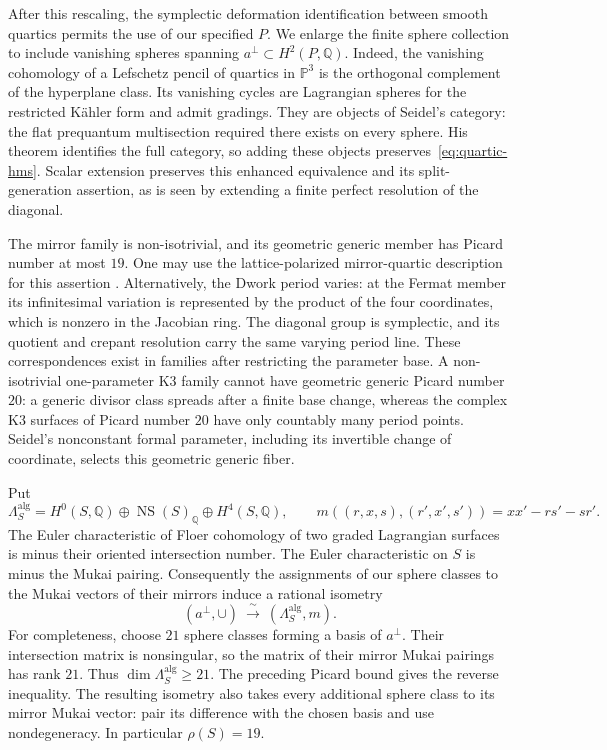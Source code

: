 \documentclass[11pt]{article}
\numberwithin{equation}{section}
\theoremstyle{definition}
\theoremstyle{remark}
\begin{document}
After this rescaling, the symplectic deformation identification between
smooth quartics permits the use of our specified $P$.  We enlarge the finite sphere collection to include
vanishing spheres spanning $a^\perp\subset H^2(P,\mathbb Q)$.  Indeed, the vanishing
cohomology of a Lefschetz pencil of quartics in $\mathbb P^3$ is the orthogonal
complement of the hyperplane class.  Its vanishing cycles are Lagrangian
spheres for the restricted K\"ahler form and admit gradings.  They are objects
of Seidel's category: the flat prequantum multisection required there exists
on every sphere.  His theorem identifies the full category, so adding these
objects preserves~\eqref{eq:quartic-hms}.  Scalar extension preserves this
enhanced equivalence and its split-generation assertion, as is seen by
extending a finite perfect resolution of the diagonal.

The mirror family is non-isotrivial, and its geometric generic member has
Picard number at most $19$.  One may use the lattice-polarized mirror-quartic
description for this assertion \cite{HMS:Dolgachev}.  Alternatively, the Dwork
period varies: at the Fermat member its infinitesimal variation is represented
by the product of the four coordinates, which is nonzero in the Jacobian
ring.  The diagonal group is symplectic, and its quotient and crepant resolution
carry the same varying period line.  These correspondences exist in families
after restricting the parameter base.  A non-isotrivial one-parameter K3
family cannot have geometric generic Picard number $20$: a generic divisor
class spreads after a finite base change, whereas the complex K3 surfaces of
Picard number $20$ have only countably many period points.  Seidel's
nonconstant formal parameter, including its invertible change of coordinate,
selects this geometric generic fiber.

Put
\[
 \Lambda_S^{\mathrm{alg}}=H^0(S,\mathbb Q)\oplus\operatorname{NS}(S)_\mathbb Q\oplus H^4(S,\mathbb Q),
 \qquad
 m((r,x,s),(r',x',s'))=xx'-rs'-sr'.
\]
The Euler characteristic of Floer cohomology of two graded Lagrangian
surfaces is minus their oriented intersection number.  The Euler
characteristic on $S$ is minus the Mukai pairing.  Consequently the assignments
of our sphere classes to the Mukai vectors of their mirrors induce a rational
isometry
\begin{equation}\label{eq:mirror-lattice}
 (a^\perp,\cup)\ \xrightarrow{\ \sim\ }\
 (\Lambda_S^{\mathrm{alg}},m).
\end{equation}
For completeness, choose $21$ sphere classes forming a basis of $a^\perp$.
Their intersection matrix is nonsingular, so the matrix of their mirror
Mukai pairings has rank $21$.  Thus $\dim\Lambda_S^{\mathrm{alg}}\ge21$.
The preceding Picard bound gives the reverse inequality.  The resulting
isometry also takes every additional sphere class to its mirror Mukai
vector: pair its difference with the chosen basis and use nondegeneracy.
In particular $\rho(S)=19$.
\end{document}
